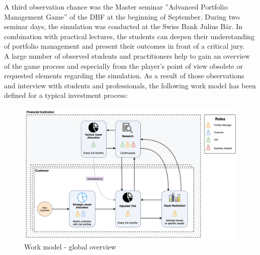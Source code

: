 A third observation chance was the Master seminar ''Advanced Portfolio Management Game'' of the DBF at the beginning of September. During two seminar days, the simulation was conducted at the Swiss Bank Julius Bär. In combination with practical lectures, the students can deepen their understanding of portfolio management and present their outcomes in front of a critical jury. \\

A large number of observed students and practitioners help to gain an overview of the game process and especially from the player’s point of view obsolete or requested elements regarding the simulation. As a result of those observations and interview with students and professionals, the following work model has been defined for a typical investment process: \\

\begin{figure}[h!]
  \centering
  \includegraphics[scale=0.35]{img/work_model_process.png}
  \caption{Work model - global overview}
\end{figure}


